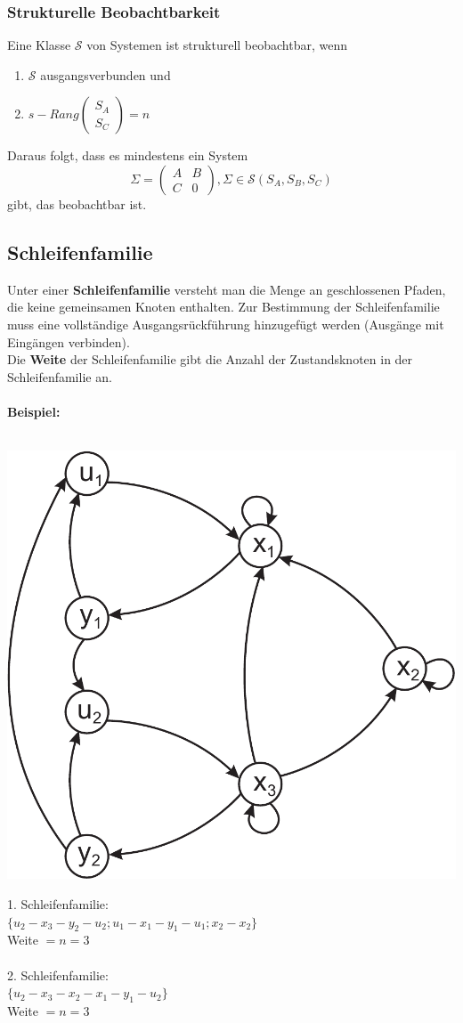\documentclass[a4paper,twocolumn,10pt]{article}
\begin{document}
\subsubsection{Strukturelle Beobachtbarkeit}
Eine Klasse $\mathcal{S}$ von Systemen ist strukturell beobachtbar, wenn
\begin{enumerate}[label=$\bullet$]
\item $\mathcal{S}$ ausgangsverbunden und
\item $s-Rang\begin{pmatrix}S_A \\ S_C\end{pmatrix}=n$
\end{enumerate}
Daraus folgt, dass es mindestens ein System
\begin{equation*}
\Sigma=\begin{pmatrix}A & B \\ C & 0\end{pmatrix},\Sigma\in\mathcal{S}(S_A,S_B,S_C)
\end{equation*}
gibt, das beobachtbar ist.

\subsection{Schleifenfamilie}
Unter einer \textbf{Schleifenfamilie} versteht man die Menge an geschlossenen Pfaden, die keine gemeinsamen Knoten enthalten. Zur Bestimmung der Schleifenfamilie muss eine vollständige Ausgangsrückführung hinzugefügt werden (Ausgänge mit Eingängen verbinden).\\
Die \textbf{Weite} der Schleifenfamilie gibt die Anzahl der Zustandsknoten in der Schleifenfamilie an.\\\\
\textbf{Beispiel:}\\\\
\begin{center}
\includegraphics[width=0.7\columnwidth]{Grafiken/Schleifenfamilie}
\end{center}
1. Schleifenfamilie:\\
$\{u_2-x_3-y_2-u_2;u_1-x_1-y_1-u_1;x_2-x_2\}$\\
Weite $=n=3$\\\\
2. Schleifenfamilie:\\
$\{u_2-x_3-x_2-x_1-y_1-u_2\}$\\
Weite $=n=3$
\end{document}
